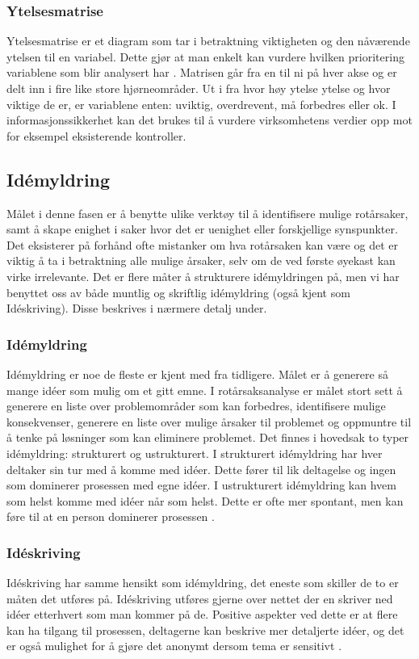 \subsubsection{Ytelsesmatrise}
Ytelsesmatrise er et diagram som tar i betraktning viktigheten og den nåværende ytelsen til en variabel. Dette gjør at man enkelt kan vurdere hvilken prioritering variablene som blir analysert har \cite{RCA}. Matrisen går fra en til ni på hver akse og er delt inn i fire like store hjørneområder. Ut i fra hvor høy ytelse ytelse og hvor viktige de er, er variablene enten: uviktig, overdrevent, må forbedres eller ok. I informasjonssikkerhet kan det brukes til å vurdere virksomhetens verdier opp mot for eksempel eksisterende kontroller.

\subsection{Idémyldring}
Målet i denne fasen er å benytte ulike verktøy til å identifisere mulige rotårsaker, samt å skape enighet i saker hvor det er uenighet eller forskjellige synspunkter. Det eksisterer på forhånd ofte mistanker om hva rotårsaken kan være og det er viktig å ta i betraktning alle mulige årsaker, selv om de ved første øyekast kan virke irrelevante. Det er flere måter å strukturere idémyldringen på, men vi har benyttet oss av både muntlig og skriftlig idémyldring (også kjent som Idéskriving). Disse beskrives i nærmere detalj under. 

\subsubsection{Idémyldring}
Idémyldring er noe de fleste er kjent med fra tidligere. Målet er å generere så mange idéer som mulig om et gitt emne. I rotårsaksanalyse er målet stort sett å generere en liste over problemområder som kan forbedres, identifisere mulige konsekvenser, generere en liste over mulige årsaker til problemet og oppmuntre til å tenke på løsninger som kan eliminere problemet. Det finnes i hovedsak to typer idémyldring: strukturert og ustrukturert. I strukturert idémyldring har hver deltaker sin tur med å komme med idéer. Dette fører til lik deltagelse og ingen som dominerer prosessen med egne idéer. I ustrukturert idémyldring kan hvem som helst komme med idéer når som helst. Dette er ofte mer spontant, men kan føre til at en person dominerer prosessen \cite{RCA}. 

\subsubsection{Idéskriving}
Idéskriving har samme hensikt som idémyldring, det eneste som skiller de to er måten det utføres på. Idéskriving utføres gjerne over nettet der en skriver ned idéer etterhvert som man kommer på de. Positive aspekter ved dette er at flere kan ha tilgang til prosessen, deltagerne kan beskrive mer detaljerte idéer, og det er også mulighet for å gjøre det anonymt dersom tema er sensitivt \cite{RCA}. 

